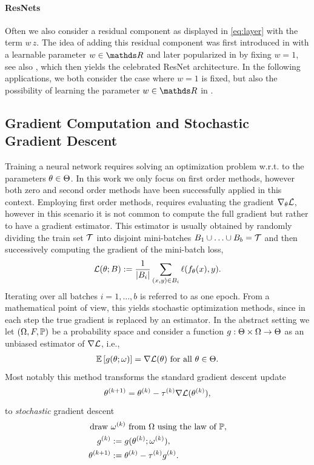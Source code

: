 \paragraph{ResNets} Often we also consider a residual component as displayed in \cref{eq:layer} with the term $w\, z$. The idea of adding this residual component was first introduced in \cite{srivastava2015highway} with a learnable parameter $w\in\R$ and later popularized in \cite{he2016deep} by fixing $w=1$, see also \cite{he2016identity}, which then yields the celebrated ResNet architecture. In the following applications, we both consider the case where $w=1$ is fixed, but also the possibility of learning the parameter $w\in\R$ in \cite{bungert2021neural}.
%
\subsection{Gradient Computation and Stochastic Gradient Descent}\label{sec:SGD}
%
%
Training a neural network requires solving an optimization problem w.r.t. to the parameters $\param\in\Param$. In this work we only focus on first order methods, however both zero \cite{riedl2022leveraging, pinnau2017consensus, carrillo2021consensus} and second order methods \cite{martens2010deep} have been successfully applied in this context. Employing first order methods, requires evaluating the gradient $\nabla_\theta \empLoss$, however in this scenario it is not common to compute the full gradient but rather to have a gradient estimator. This estimator is usually obtained by randomly dividing the train set $\trSet$ into disjoint mini-batches $B_1\cup\ldots\cup B_b = \trSet$ and then successively computing the gradient of the mini-batch loss,
%
\begin{align*}
\empLoss(\param;B):=\frac{1}{\abs{B_i}}\sum_{(x,y)\in B_i} \ell(f_\param(x), y).
\end{align*}
%
%
Iterating over all batches $i=1,\ldots,b$ is referred to as one epoch. From a mathematical point of view, this yields stochastic optimization methods, since in each step the true gradient is replaced by an estimator. In the abstract setting we let $(\Omega,F,\P)$ be a probability space and consider a function $g:\Param\times \Omega\to \Param$ as an unbiased estimator of $\nabla\empLoss$, i.e.,
%
\begin{align*}
\Exp{g(\param;\omega)} = \nabla\empLoss(\param)\text{ for all } \param\in\Param.
\end{align*}
%
Most notably this method transforms the standard gradient descent update \cite{cauchy1847methode}
%
\begin{align*}
\param^{(k+1)} = \param^{(k)} - \tau^{(k)} \nabla \empLoss(\theta^{(k)}),
\end{align*}
%
to \emph{stochastic} gradient descent \cite{robbins1951stochastic}
%
\begin{align*}
\text{draw }&\omega^{(k)}\text{ from }\Omega\text{ using the law of }\P,\\
g^{(k)} &:= {g(\param^{(k)};\omega^{(k)})},\\
\param^{(k+1)} &:= \param^{(k)} - \tau^{(k)} g^{(k)}.
\end{align*}
%
%
%
%
%
\clearpage%
